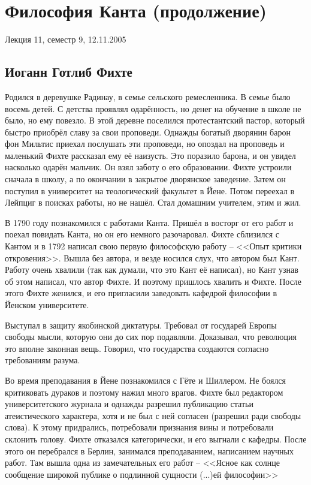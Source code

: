 \section{Философия Канта (продолжение)}
Лекция 11, семестр 9, 12.11.2005


\subsection{Иоганн Готлиб Фихте}

Родился в деревушке Радинау, в семье сельского ремесленника. В семье было восемь детей. С детства проявлял одарённость, но денег на обучение в школе не было, но ему повезло. В этой деревне поселился протестантский пастор, который быстро приобрёл славу за свои проповеди. Однажды богатый дворянин барон фон Мильтис приехал послушать эти проповеди, но опоздал на проповедь и маленький Фихте рассказал ему её наизусть. Это поразило барона, и он увидел насколько одарён мальчик. Он взял заботу о его образовании. Фихте устроили сначала в школу, а по окончании в закрытое дворянское заведение. Затем он поступил в университет на теологический факультет в Йене. Потом переехал в Лейпциг в поисках работы, но не нашёл. Стал домашним учителем, этим и жил.

В 1790 году познакомился с работами Канта. Пришёл в восторг от его работ и поехал повидать Канта, но он его немного разочаровал. Фихте сблизился с Кантом и в 1792 написал свою первую философскую работу – <<Опыт критики откровения>>. Вышла без автора, и везде носился слух, что автором был Кант. Работу очень хвалили (так как думали, что это Кант её написал), но Кант узнав об этом написал, что автор Фихте. И поэтому пришлось хвалить и Фихте. После этого Фихте женился, и его пригласили заведовать кафедрой философии в Йенском университете.

    Выступал в защиту якобинской диктатуры. Требовал от государей Европы свободы мысли, которую они до сих пор подавляли. Доказывал, что революция это вполне законная вещь. Говорил, что государства создаются согласно требованиям разума.

Во время преподавания в Йене познакомился с Гёте и Шиллером. Не боялся критиковать дураков и поэтому нажил много врагов. Фихте был редактором университетского журнала и однажды разрешил публикацию статьи атеистического характера, хотя и не был с ней согласен (разрешил ради свободы слова). К этому придрались, потребовали признания вины и потребовали склонить голову. Фихте отказался категорически, и его выгнали с кафедры. После этого он перебрался в Берлин, занимался преподаванием, написанием научных работ. Там вышла одна из замечательных его работ – <<Ясное как солнце сообщение широкой публике о подлинной сущности (...)ей философии>>

